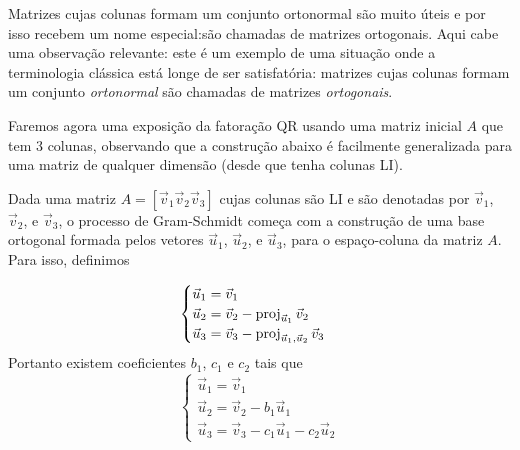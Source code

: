 \documentclass[../livro.tex]{subfiles}  %
\begin{document}
Matrizes cujas colunas formam um conjunto ortonormal são muito úteis e por isso recebem um nome especial:são chamadas de matrizes ortogonais. Aqui cabe uma observação relevante: este é um exemplo de uma situação onde a terminologia clássica está longe de ser satisfatória: matrizes  cujas colunas formam um conjunto {\it ortonormal} são chamadas de matrizes {\it ortogonais}.   

\medskip

Faremos agora uma exposição da fatoração QR usando uma matriz inicial $A$ que tem 3 colunas, observando que a construção abaixo é facilmente generalizada para uma matriz de qualquer dimensão (desde que tenha colunas LI).

Dada uma matriz $A=[\vec{v}_1 \vec{v}_2 \vec{v}_3]$ cujas colunas são LI e são denotadas por $\vec{v}_1$, $\vec{v}_2$, e $\vec{v}_3$, 
o processo de Gram-Schmidt começa com a construção de uma base ortogonal formada pelos vetores
$\vec{u}_1$, $\vec{u}_2$, e $\vec{u}_3$,
para o espaço-coluna da matriz $A$. Para isso, definimos

\begin{equation}
\begin{cases}
\vec{u}_1 = \vec{v}_1 \\ 
\vec{u}_2 = \vec{v}_2 - \operatorname{proj}_{\vec{u}_1} \vec{v}_2 \\
\vec{u}_3 = \vec{v}_3 - \operatorname{proj}_{\vec{u}_1,\vec{u}_2} \vec{v}_3
\end{cases}
\end{equation}
Portanto existem coeficientes $b_1$, $c_1$ e $c_2$ tais que 
\begin{equation}
\begin{cases}
\vec{u}_1 = \vec{v}_1 \\ 
\vec{u}_2 = \vec{v}_2 - b_1 \vec{u}_1 \\
\vec{u}_3 = \vec{v}_3 - c_1 \vec{u}_1 - c_2 \vec{u}_2
\end{cases}
\end{equation}
\end{document}
